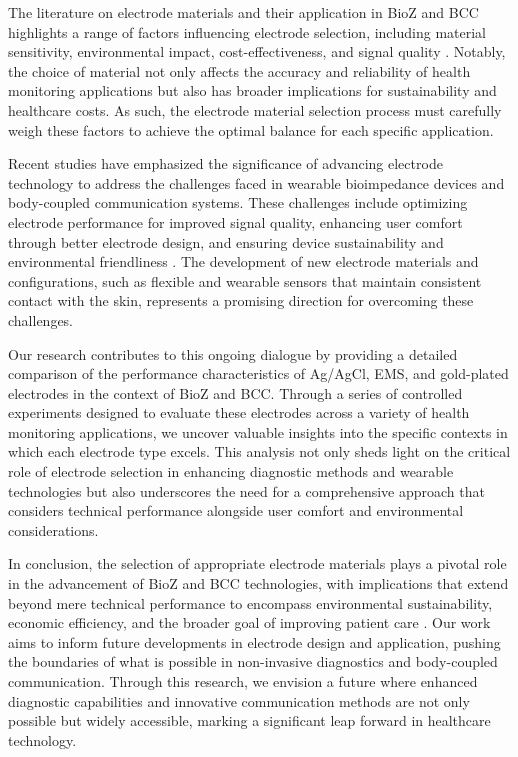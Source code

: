 {    The literature on electrode materials and their application in \gls{BioZ}  and BCC highlights a range of factors influencing electrode selection, including material sensitivity, environmental impact, cost-effectiveness, and signal quality \cite{Buxi2013correlation}. Notably, the choice of material not only affects the accuracy and reliability of health monitoring applications but also has broader implications for sustainability and healthcare costs. As such, the electrode material selection process must carefully weigh these factors to achieve the optimal balance for each specific application.
    
    Recent studies have emphasized the significance of advancing electrode technology to address the challenges faced in wearable bioimpedance devices and body-coupled communication systems. These challenges include optimizing electrode performance for improved signal quality, enhancing user comfort through better electrode design, and ensuring device sustainability and environmental friendliness \cite{zaira2023prediction}. The development of new electrode materials and configurations, such as flexible and wearable sensors that maintain consistent contact with the skin, represents a promising direction for overcoming these challenges.
    
    Our research contributes to this ongoing dialogue by providing a detailed comparison of the performance characteristics of Ag/AgCl, EMS, and gold-plated electrodes in the context of \gls{BioZ}  and BCC. Through a series of controlled experiments designed to evaluate these electrodes across a variety of health monitoring applications, we uncover valuable insights into the specific contexts in which each electrode type excels. This analysis not only sheds light on the critical role of electrode selection in enhancing diagnostic methods and wearable technologies but also underscores the need for a comprehensive approach that considers technical performance alongside user comfort and environmental considerations.
    
    In conclusion, the selection of appropriate electrode materials plays a pivotal role in the advancement of \gls{BioZ}  and BCC technologies, with implications that extend beyond mere technical performance to encompass environmental sustainability, economic efficiency, and the broader goal of improving patient care \cite{ormanis2020towards}. Our work aims to inform future developments in electrode design and application, pushing the boundaries of what is possible in non-invasive diagnostics and body-coupled communication. Through this research, we envision a future where enhanced diagnostic capabilities and innovative communication methods are not only possible but widely accessible, marking a significant leap forward in healthcare technology.
}